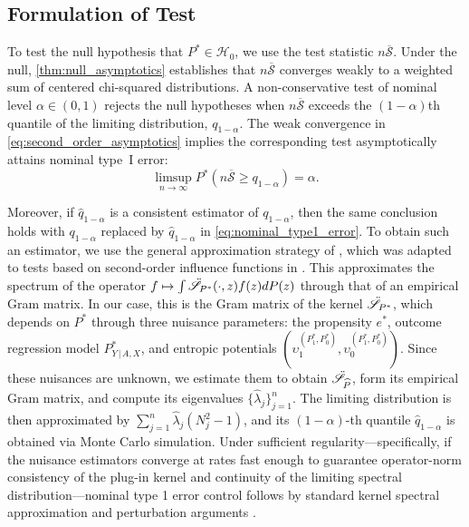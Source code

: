 \documentclass{article}
\theoremstyle{plain}
\theoremstyle{definition}
\theoremstyle{remark}
\newcommand{\ucH}{\mathscr{H}}
\newcommand{\hP}{\widehat{P}}
\newcommand{\1}{\mathbbm{1}}
\newcommand{\STE}{\mathscr{S}}
\theoremstyle{plain}
\theoremstyle{definition}
\newcommand{\mymid}{\,|\,}
\begin{document}
\subsection{Formulation of Test}

To test the null hypothesis that $P^* \in \ucH_0$, we use the test statistic $n \overline{\STE}$. Under the null, \cref{thm:null_asymptotics} establishes that $n \overline{\STE}$ converges weakly to a weighted sum of centered chi-squared distributions. A non-conservative test of nominal level $\alpha \in (0,1)$ rejects the null hypotheses when $n \overline{\STE}$ exceeds the $(1-\alpha)$th quantile of the limiting distribution, $q_{1-\alpha}$. The weak convergence in \eqref{eq:second_order_asymptotics} implies the corresponding test asymptotically attains nominal type~I error:
\begin{equation}\label{eq:nominal_type1_error}
    \limsup_{n \to \infty} P^*(n \overline{\STE} \geq q_{1-\alpha}) = \alpha.
\end{equation}

Moreover, if $\hat{q}_{1-\alpha}$ is a consistent estimator of $q_{1-\alpha}$, then the same conclusion holds with $q_{1-\alpha}$ replaced by $\hat{q}_{1-\alpha}$ in \eqref{eq:nominal_type1_error}.
To obtain such an estimator, we use the general approximation strategy of \citet{gretton2009fast}, which was adapted to tests based on second-order influence functions in \citet{luedtke2019omnibus}. This approximates the spectrum of the operator $f \mapsto \int \Ddot{\STE}_{P^*}(\cdot, z) f(z) dP(z)$ through that of an empirical Gram matrix. In our case, this is the Gram matrix of the kernel $\Ddot{\STE}_{P^*}$, which depends on ${P^*}$ through three nuisance parameters: the propensity $e^*$, outcome regression model $P_{Y \mymid A, X}^*$, and entropic potentials $(\upsilon_1^{(P_1^*, P_0^*)}, \upsilon_0^{(P_1^*, P_0^*)})$. Since these nuisances are unknown, we estimate them to obtain $\Ddot{\STE}_{\hP}$, form its empirical Gram matrix, and compute its eigenvalues $\{\hat{\lambda}_j\}_{j=1}^n$. The limiting distribution is then approximated by $\sum_{j=1}^n \hat{\lambda}_j (N_j^2 - 1)$, and its $(1-\alpha)$-th quantile $\hat{q}_{1-\alpha}$ is obtained via Monte Carlo simulation. Under sufficient regularity---specifically, if the nuisance estimators converge at rates fast enough to guarantee operator-norm consistency of the plug-in kernel and continuity of the limiting spectral distribution---nominal type 1 error control follows by standard kernel spectral approximation and perturbation arguments \citep{shawe2005eigenspectrum, zwald2005convergence, rosasco2010learning}.
\end{document}

